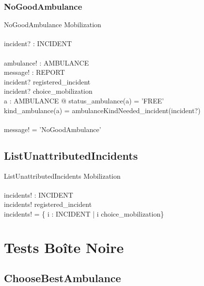 \documentclass[12pt]{article}
\begin{document}
\subsubsection{NoGoodAmbulance}

\begin{schema}{NoGoodAmbulance}
	\Xi Mobilization		\\
	\newline				\\
	incident? : INCIDENT	\\
	\newline				\\
	ambulance! : AMBULANCE	\\
	message! : REPORT		\\
  \where
	incident? \in registered\_incident \\
	incident? \notin \ran choice\_mobilization \\
	\not \exists a : AMBULANCE @ status\_ambulance(a) = 'FREE' \land \\
	 kind\_ambulance(a) = ambulanceKindNeeded\_incident(incident?) \\
	\newline \\
	message! = 'NoGoodAmbulance'
\end{schema}

\subsection{ListUnattributedIncidents}

\begin{schema}{ListUnattributedIncidents}
	\Xi Mobilization		\\
	\newline				\\
	incidents! : \power INCIDENT \\
  \where
	incidents! \subseteq registered\_incident \\
	incidents! = \{ i : INCIDENT | i \notin \ran choice\_mobilization\}
\end{schema}

\section{Tests Boîte Noire}

\subsection{ChooseBestAmbulance}
\end{document}
